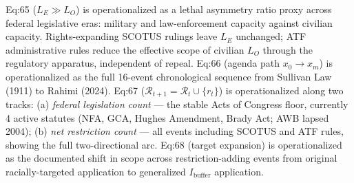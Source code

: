 Eq:65 ($L_E \gg L_O$) is operationalized as a lethal asymmetry ratio proxy across federal legislative eras: military and law-enforcement capacity against civilian capacity. Rights-expanding SCOTUS rulings leave $L_E$ unchanged; ATF administrative rules reduce the effective scope of civilian $L_O$ through the regulatory apparatus, independent of repeal. Eq:66 (agenda path $x_0 \rightarrow x_m$) is operationalized as the full 16-event chronological sequence from Sullivan Law (1911) to Rahimi (2024). Eq:67 ($\mathcal{R}_{t+1} = \mathcal{R}_t \cup \{r_t\}$) is operationalized along two tracks: (a) \textit{federal legislation count} --- the stable Acts of Congress floor, currently 4 active statutes (NFA, GCA, Hughes Amendment, Brady Act; AWB lapsed 2004); (b) \textit{net restriction count} --- all events including SCOTUS and ATF rules, showing the full two-directional arc. Eq:68 (target expansion) is operationalized as the documented shift in scope across restriction-adding events from original racially-targeted application to generalized $I_{\text{buffer}}$ application.

